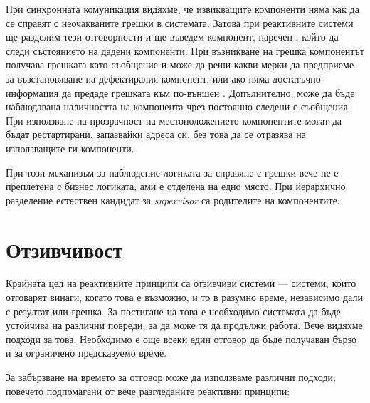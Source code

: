 При синхронната комуникация видяхме, че извикващите компоненти няма как да се справят с неочакваните грешки в системата. Затова при реактивните системи ще разделим тези отговорности и ще въведем компонент, наречен , който да следи състоянието на дадени компоненти. При възникване на грешка  компонентът получава грешката като съобщение и може да реши какви мерки да предприеме за възстановяване на дефектиралия компонент, или ако няма достатъчно информация да предаде грешката към по-външен . Допълнително, може да бъде наблюдавана наличността на компонента чрез постоянно следени с  съобщения. При използване на прозрачност на местоположението компонентите могат да бъдат рестартирани, запазвайки адреса си, без това да се отразява на използващите ги компоненти.

При този механизъм за наблюдение логиката за справяне с грешки вече не е преплетена с бизнес логиката, ами е отделена на едно място. При йерархично разделение естествен кандидат за \emph{supervisor} са родителите на компонентите.

\section{Отзивчивост}
\label{sec:responsive}

Крайната цел на реактивните принципи са отзивчиви системи — системи, които отговарят винаги, когато това е възможно, и то в разумно време, независимо дали с резултат или грешка. За постигане на това е необходимо системата да бъде устойчива на различни повреди, за да може тя да продължи работа. Вече видяхме подходи за това. Необходимо е още всеки един отговор да бъде получаван бързо и за ограничено предсказуемо време.

За забързване на времето за отговор може да използваме различни подходи, повечето подпомагани от вече разгледаните реактивни принципи:

